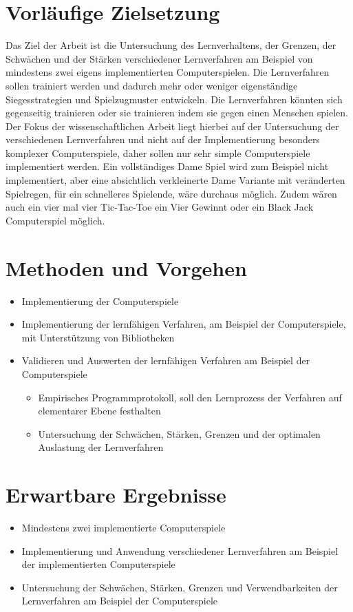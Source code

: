 \documentclass[12pt,a4paper]{scrartcl}
\begin{document}
\section*{Vorläufige Zielsetzung}
Das Ziel der Arbeit ist die Untersuchung des Lernverhaltens, der Grenzen, der Schwächen und der Stärken verschiedener Lernverfahren am Beispiel von mindestens zwei eigens implementierten Computerspielen. Die Lernverfahren sollen trainiert werden und dadurch mehr oder weniger eigenständige Siegesstrategien und Spielzugmuster entwickeln. Die Lernverfahren könnten sich gegenseitig trainieren oder sie trainieren indem sie gegen einen Menschen spielen. Der Fokus der wissenschaftlichen Arbeit liegt hierbei auf der Untersuchung der verschiedenen Lernverfahren und nicht auf der Implementierung besonders komplexer Computerspiele, daher sollen nur sehr simple Computerspiele implementiert werden. Ein vollständiges Dame Spiel wird zum Beispiel nicht implementiert, aber eine absichtlich verkleinerte Dame Variante mit veränderten Spielregen, für ein schnelleres Spielende, wäre durchaus möglich. Zudem wären auch ein vier mal vier Tic-Tac-Toe ein Vier Gewinnt oder ein Black Jack Computerspiel möglich.

\section*{Methoden und Vorgehen}

\begin{itemize}
	\item Implementierung der Computerspiele
	\item Implementierung der lernfähigen Verfahren, am Beispiel der Computerspiele, mit Unterstützung von Bibliotheken
	\item Validieren und Auswerten der lernfähigen Verfahren am Beispiel der Computerspiele
	\begin{itemize}
		\item Empirisches Programmprotokoll, soll den Lernprozess der Verfahren auf elementarer Ebene festhalten
		\item Untersuchung der Schwächen, Stärken, Grenzen und der optimalen Auslastung der Lernverfahren
	\end{itemize}
\end{itemize}	

\section*{Erwartbare Ergebnisse}
\begin{itemize}
	\item Mindestens zwei implementierte Computerspiele
	\item Implementierung und Anwendung verschiedener Lernverfahren am Beispiel der implementierten Computerspiele
	\item Untersuchung der Schwächen, Stärken, Grenzen und Verwendbarkeiten der Lernverfahren am Beispiel der Computerspiele
\end{itemize}
\end{document}

